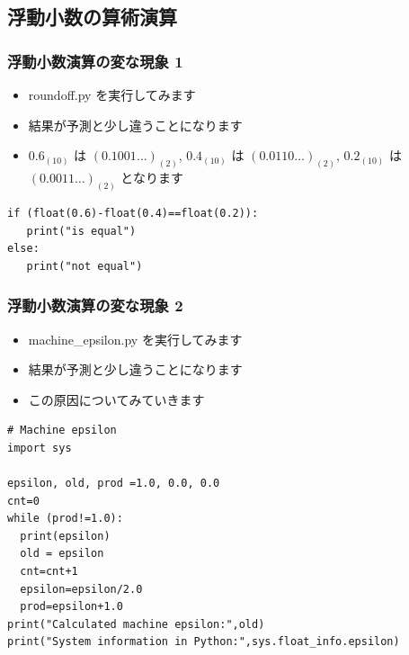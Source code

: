 \subsection{浮動小数の算術演算}
\begin{frame}
\frametitle{浮動小数演算の変な現象 1}
  \begin{itemize}
\item roundoff.py を実行してみます
\item 結果が予測と少し違うことになります
\item \(0.6_{(10)}\) は \((0.1001\ldots)_{(2)}\), \(0.4_{(10)}\) は \((0.0110\ldots)_{(2)}\), \(0.2_{(10)}\) は \((0.0011\ldots)_{(2)}\) となります
  \end{itemize}
  \begin{lstlisting}[caption={roundoff.py},label=lst:roundoff]
if (float(0.6)-float(0.4)==float(0.2)):
   print("is equal")
else:
   print("not equal")
  \end{lstlisting}
\end{frame}
\begin{frame}
\frametitle{浮動小数演算の変な現象 2}
  \begin{itemize}
\item machine\_epsilon.py を実行してみます
\item 結果が予測と少し違うことになります
\item この原因についてみていきます
  \end{itemize}
  \begin{lstlisting}[caption={machine\_epsilon.py},label=lst:epsilon]
# Machine epsilon
import sys

epsilon, old, prod =1.0, 0.0, 0.0
cnt=0
while (prod!=1.0):
  print(epsilon)
  old = epsilon
  cnt=cnt+1
  epsilon=epsilon/2.0
  prod=epsilon+1.0
print("Calculated machine epsilon:",old)
print("System information in Python:",sys.float_info.epsilon)
  \end{lstlisting}
\end{frame}
